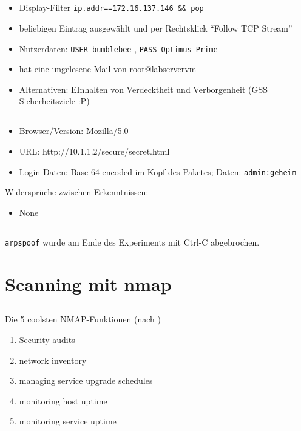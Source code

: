 \documentclass[twoside]{article}
\newcommand{\say}[1]{%
	``#1''%
}
\newcommand{\ttt}[1]{%
	\texttt{#1}%
}
\begin{document}
\subsection{}
\begin{itemize}
	\item Display-Filter \ttt{ip.addr==172.16.137.146 \&\& pop}
	\item beliebigen Eintrag ausgewählt und per Rechtsklick \say{Follow TCP Stream}
	\item Nutzerdaten: \ttt{USER bumblebee}, \ttt{PASS Optimus Prime}
	\item hat eine ungelesene Mail von root@labservervm
	\item Alternativen: EInhalten von Verdecktheit und Verborgenheit (GSS Sicherheitsziele :P)
\end{itemize}
\subsection{}
	\begin{itemize}
		\item Browser/Version: Mozilla/5.0
		\item URL: http://10.1.1.2/secure/secret.html
		\item Login-Daten: Base-64 encoded im Kopf des Paketes; Daten: \ttt{admin:geheim}
	\end{itemize}
Widersprüche zwischen Erkenntnissen:
\begin{itemize}
	\item None
\end{itemize}
\subsection{}
\ttt{arpspoof} wurde am Ende des Experiments mit Ctrl-C abgebrochen.

\section{Scanning mit nmap}
\subsection{}
Die 5 coolsten NMAP-Funktionen (nach \cite{nmap})
\begin{enumerate}
	\item Security audits
	\item network inventory
	\item managing service upgrade schedules
	\item monitoring host uptime
	\item monitoring service uptime
\end{enumerate}
\end{document}
